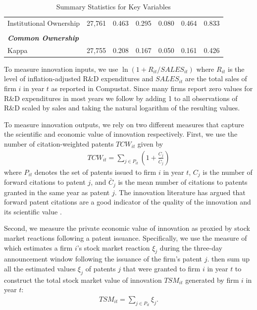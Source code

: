 \documentclass[12pt]{article}
\begin{document}
\begin{table}[!htbp]
{\begin{tabular}{lrrrrrr}
Institutional Ownership &     27,761    &                0.463    &                0.295    &                0.080    &     0.464    &           0.833    \\
          &       &       &       &       &       &  \\
\textit{\textbf{Common Ownership}} &       &       &       &       &       &  \\
Kappa &     27,755    &                0.208    &                0.167    &                0.050    &     0.161    &           0.426    \\
\bottomrule
\end{tabular}
}
\protect\caption{Summary Statistics for Key Variables}
\label{tab:sumstats}
\end{table}


To measure innovation inputs, we use $\ln(1+R_{it}/\mathit{SALES}_{it})$ where $R_{it}$ is the level of inflation-adjusted R\&D expenditures and $\mathit{SALES}_{it}$ are the total sales of firm $i$ in year $t$ as reported in Compustat. Since many firms report zero values for R\&D expenditures in most years we follow \cite{branstetter2006stronger} by adding 1 to all observations of R\&D scaled by sales and taking the natural logarithm of the resulting values. 

To measure innovation outputs, we rely on two different measures that capture the scientific and economic value of innovation respectively. First, we use the number of citation-weighted patents $\mathit{TCW}_{it}$ given by
\begin{align}
\mathit{TCW}_{it} = \sum_{j \in P_{it}} \left(1 + \frac{C_{j}}{\bar{C}_{j}} \right)
\end{align}
where $P_{it}$ denotes the set of patents issued to firm $i$ in year $t$, $C_{j}$ is the number of forward citations to patent $j$, and $\bar{C}_{j}$ is the mean number of citations to patents granted in the same year as patent $j$. The innovation literature has argued that forward patent citations are a good indicator of the quality of the innovation and its scientific value \citep{hall2001nber}.

Second, we measure the private economic value of innovation \citep{hall2005,kogan2012technological} as proxied by stock market reactions following a patent issuance. Specifically, we use the measure of \cite{kogan2012technological} which estimates a firm $i$'s stock market reaction $\xi_{j}$ during the three-day announcement window following the issuance of the firm's patent $j$. \cite{kogan2012technological}  then sum up all the estimated values $\xi_{j}$ of patents $j$ that were granted to firm $i$ in year $t$ to construct the total stock market value of innovation $\mathit{TSM}_{it}$ generated by firm $i$ in year $t$: 
\begin{align}
\mathit{TSM}_{it} = \sum_{j \in P_{it}} \xi_{j}.
\end{align}
\end{document}
